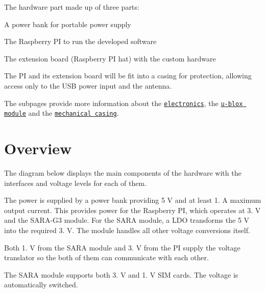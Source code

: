 The hardware part made up of three parts\+:
\begin{DoxyEnumerate}
\item A power bank for portable power supply
\end{DoxyEnumerate}
\begin{DoxyEnumerate}
\item The Raspberry PI to run the developed software
\end{DoxyEnumerate}
\begin{DoxyEnumerate}
\item The extension board (Raspberry PI hat) with the custom hardware
\end{DoxyEnumerate}

The PI and its extension board will be fit into a casing for protection, allowing access only to the U\+SB power input and the antenna.

The subpages provide more information about the \href{../Hardware%3A-Electronics}{\tt electronics}, the \href{./uBlox-and-CellLocate}{\tt u-\/blox module} and the \href{../Hardware%3A-Mechanical}{\tt mechanical casing}.

\section*{Overview}

The diagram below displays the main components of the hardware with the interfaces and voltage levels for each of them.

The power is supplied by a power bank providing 5 V and at least 1. A maximum output current. This provides power for the Raspberry PI, which operates at 3. V and the S\+A\+R\+A-\/\+G3 module. For the S\+A\+RA module, a L\+DO transforms the 5 V into the required 3. V. The module handles all other voltage conversions itself.

Both 1. V from the S\+A\+RA module and 3. V from the PI supply the voltage translator so the both of them can communicate with each other.

The S\+A\+RA module supports both 3. V and 1. V S\+IM cards. The voltage is automatically switched.

 